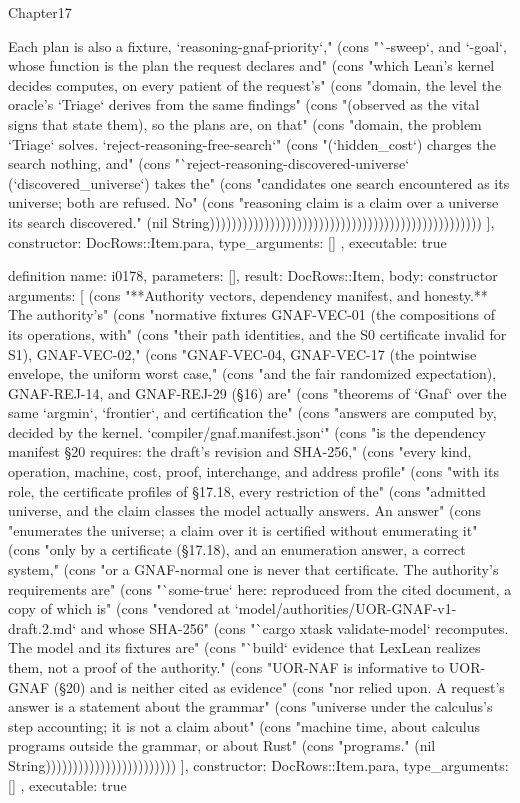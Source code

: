 \begin{lexlean}{Chapter17}
\begin{semanticmodule}
{{Each plan is also a fixture, `reasoning-gnaf-priority`," (cons "`-sweep`, and `-goal`, whose function is the plan the request declares and" (cons "which Lean's kernel decides computes, on every patient of the request's" (cons "domain, the level the oracle's `Triage` derives from the same findings" (cons "(observed as the vital signs that state them), so the plans are, on that" (cons "domain, the problem `Triage` solves. `reject-reasoning-free-search`" (cons "(`hidden_cost`) charges the search nothing, and" (cons "`reject-reasoning-discovered-universe` (`discovered_universe`) takes the" (cons "candidates one search encountered as its universe; both are refused. No" (cons "reasoning claim is a claim over a universe its search discovered." (nil String))))))))))))))))))))))))))))))))))))))))))))))))))
    ],
    constructor: DocRows::Item.para,
    type_arguments: []
  },
  executable: true
}

definition{
  name: i0178,
  parameters: [],
  result: DocRows::Item,
  body: constructor{
    arguments: [
      (cons "**Authority vectors, dependency manifest, and honesty.** The authority's" (cons "normative fixtures GNAF-VEC-01 (the compositions of its operations, with" (cons "their path identities, and the S0 certificate invalid for S1), GNAF-VEC-02," (cons "GNAF-VEC-04, GNAF-VEC-17 (the pointwise envelope, the uniform worst case," (cons "and the fair randomized expectation), GNAF-REJ-14, and GNAF-REJ-29 (§16) are" (cons "theorems of `Gnaf` over the same `argmin`, `frontier`, and certification the" (cons "answers are computed by, decided by the kernel. `compiler/gnaf.manifest.json`" (cons "is the dependency manifest §20 requires: the draft's revision and SHA-256," (cons "every kind, operation, machine, cost, proof, interchange, and address profile" (cons "with its role, the certificate profiles of §17.18, every restriction of the" (cons "admitted universe, and the claim classes the model actually answers. An answer" (cons "enumerates the universe; a claim over it is certified without enumerating it" (cons "only by a certificate (§17.18), and an enumeration answer, a correct system," (cons "or a GNAF-normal one is never that certificate. The authority's requirements are" (cons "`some-true` here: reproduced from the cited document, a copy of which is" (cons "vendored at `model/authorities/UOR-GNAF-v1-draft.2.md` and whose SHA-256" (cons "`cargo xtask validate-model` recomputes. The model and its fixtures are" (cons "`build` evidence that LexLean realizes them, not a proof of the authority." (cons "UOR-NAF is informative to UOR-GNAF (§20) and is neither cited as evidence" (cons "nor relied upon. A request's answer is a statement about the grammar" (cons "universe under the calculus's step accounting; it is not a claim about" (cons "machine time, about calculus programs outside the grammar, or about Rust" (cons "programs." (nil String))))))))))))))))))))))))
    ],
    constructor: DocRows::Item.para,
    type_arguments: []
  },
  executable: true
}


\end{semanticmodule}
\end{lexlean}
